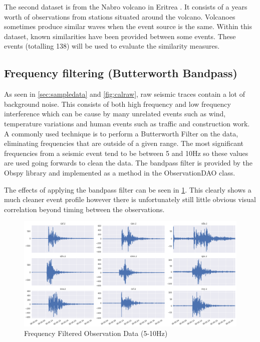 \documentclass[../report.tex]{subfiles}
\begin{document}
	The second dataset is from the Nabro volcano in Eritrea \citep{eritrea1}.  It consists of a years worth of observations from stations situated around the volcano.  Volcanoes sometimes produce similar waves when the event source is the same.  Within this dataset, known similarities have been provided between some events.  These events (totalling 138) will be used to evaluate the similarity measures.

\subsection{Frequency filtering (Butterworth Bandpass)}
	As seen in \cref{sec:sampledata} and \cref{fig:calraw}, raw seismic traces contain a lot of background noise.  This consists of both high frequency and low frequency interference which can be cause by many unrelated events such as wind, temperature variations and human events such as traffic and construction work.  A commonly used technique \citep{man-seis-obs} is to perform a Butterworth Filter \citep{bandpass} on the data, eliminating frequencies that are outside of a given range.  The most significant frequencies from a seismic event tend to be between 5 and 10Hz so these values are used going forwards to clean the data.  The bandpass filter is provided by the Obspy library and implemented as a method in the ObservationDAO class.
	
	The effects of applying the bandpass filter can be seen in \cref{fig:calbandpass}.  This clearly shows a much cleaner event profile however there is unfortunately still little obvious visual correlation beyond timing between the observations.

\begin{figure}[H]
	\centering
	\includegraphics[width=1\linewidth]{img/cal_bandpass}
	\caption{Frequency Filtered Observation Data (5-10Hz)}
	\label{fig:calbandpass}
\end{figure}
\end{document}
